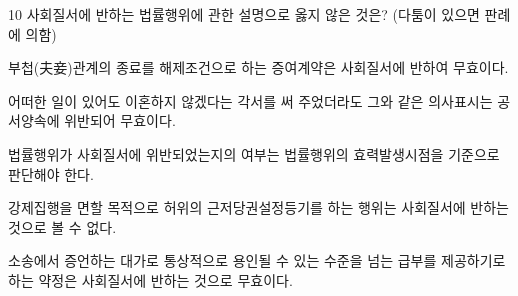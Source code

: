 \begin{question}{10}
사회질서에 반하는 법률행위에 관한 설명으로 옳지 않은 것은? (다툼이 있으면 판례에 의함)
\begin{choices}
  \item 부첩(夫妾)관계의 종료를 해제조건으로 하는 증여계약은 사회질서에 반하여 무효이다.
  \item 어떠한 일이 있어도 이혼하지 않겠다는 각서를 써 주었더라도 그와 같은 의사표시는 공서양속에 위반되어 무효이다.
  \item 법률행위가 사회질서에 위반되었는지의 여부는 법률행위의 효력발생시점을 기준으로 판단해야 한다.
  \item 강제집행을 면할 목적으로 허위의 근저당권설정등기를 하는 행위는 사회질서에 반하는 것으로 볼 수 없다.
  \item 소송에서 증언하는 대가로 통상적으로 용인될 수 있는 수준을 넘는 급부를 제공하기로 하는 약정은 사회질서에 반하는 것으로 무효이다.
\end{choices}
\end{question}
